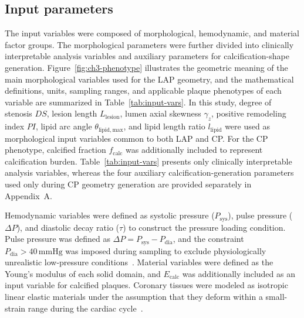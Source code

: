 \documentclass[master,english,final]{kaist-ucs}
\begin{document}
\subsection{Input parameters}
The input variables were composed of morphological, hemodynamic, and material factor groups. The morphological parameters were further divided into clinically interpretable analysis variables and auxiliary parameters for calcification-shape generation. Figure~\ref{fig:ch3-phenotype} illustrates the geometric meaning of the main morphological variables used for the LAP geometry, and the mathematical definitions, units, sampling ranges, and applicable plaque phenotypes of each variable are summarized in Table~\ref{tab:input-vars}. In this study, degree of stenosis $DS$, lesion length $L_\mathrm{lesion}$, lumen axial skewness $\gamma_z$, positive remodeling index $PI$, lipid arc angle $\theta_\mathrm{lipid,max}$, and lipid length ratio $l_\mathrm{lipid}$ were used as morphological input variables common to both LAP and CP. For the CP phenotype, calcified fraction $f_\mathrm{calc}$ was additionally included to represent calcification burden. Table~\ref{tab:input-vars} presents only clinically interpretable analysis variables, whereas the four auxiliary calcification-generation parameters used only during CP geometry generation are provided separately in Appendix~A.

Hemodynamic variables were defined as systolic pressure ($P_\mathrm{sys}$), pulse pressure ($\Delta P$), and diastolic decay ratio ($\tau$) to construct the pressure loading condition. Pulse pressure was defined as $\Delta P=P_\mathrm{sys}-P_\mathrm{dia}$, and the constraint $P_\mathrm{dia}>40\,\mathrm{mmHg}$ was imposed during sampling to exclude physiologically unrealistic low-pressure conditions~\cite{heward2025cpp, mcevoy2016diastolic}. Material variables were defined as the Young's modulus of each solid domain, and $E_\mathrm{calc}$ was additionally included as an input variable for calcified plaques. Coronary tissues were modeled as isotropic linear elastic materials under the assumption that they deform within a small-strain range during the cardiac cycle~\cite{milzi2021, loree1992}.
\end{document}
